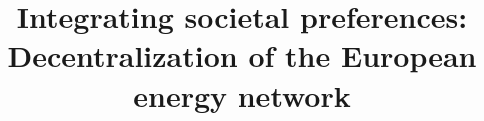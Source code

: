 \documentclass[preprint,12pt,nopreprintline]{elsarticle}
\begin{document}
\setcounter{figure}{0}

\begin{frontmatter}



\title{Integrating societal preferences: Decentralization of the European energy network}


\end{frontmatter}
\end{document}
